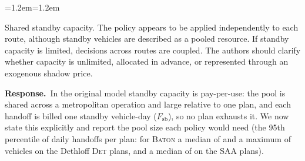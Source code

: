 \documentclass[11pt]{article}
\newenvironment{comment}{\par\medskip\noindent\color{rev}\itshape
  \begin{list}{}{\leftmargin=1.2em\rightmargin=1.2em}\item[]}%
  {\end{list}\par}
\newcommand{\resp}{\par\noindent\textbf{Response.}\ }
\newcommand{\BATON}{\textsc{Baton}}
\begin{document}
\begin{comment}
Shared standby capacity. The policy appears to be applied independently
to each route, although standby vehicles are described as a pooled
resource. If standby capacity is limited, decisions across routes are
coupled. The authors should clarify whether capacity is unlimited,
allocated in advance, or represented through an exogenous shadow price.
\end{comment}
\resp In the original model standby capacity is pay-per-use: the pool
is shared across a metropolitan operation and large relative to one
plan, and each handoff is billed one standby vehicle-day
($F_{\mathrm{sb}}$), so no plan exhausts it. We now state this
explicitly and report the pool size each policy would need (the 95th
percentile of daily handoffs per plan: for \BATON{} a median of
\poolDetMed{} and a maximum of \poolDetMax{} vehicles on the Dethloff
\textsc{Det} plans, and a median of \poolSAAMed{} on the \textsc{SAA}
plans).
\end{document}
